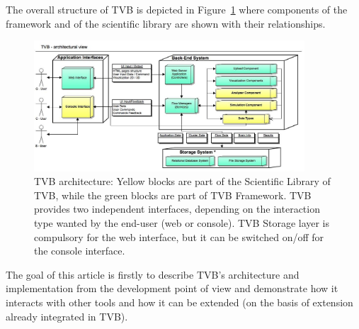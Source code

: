 
The overall structure of TVB is depicted in Figure~\ref{fig:architecture} where
components of the framework and of the scientific library are shown with
their relationships.

 \begin{figure}
        \centering
        \includegraphics[width=0.90\textwidth]{images/architecture.jpg}
        \caption{TVB architecture: Yellow blocks are part of the Scientific
            Library of TVB, while the green blocks are part of TVB Framework.
            TVB provides two independent interfaces, depending on the
            interaction type wanted by the end-user (web or console).  TVB
            Storage layer is compulsory for the web interface, but it can be
            switched on/off for the console interface.  
         }
        \label{fig:architecture}
 \end{figure}

 The goal of this article is firstly to describe TVB's architecture and 
 implementation from the
 development point of view and demonstrate how it interacts with other tools
 and how it can be extended (on the basis of extension already integrated in
 TVB).
